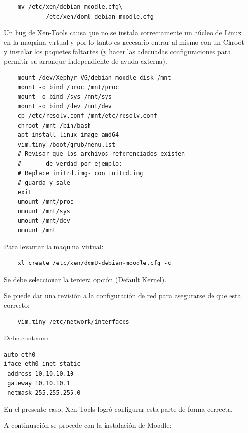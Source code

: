 \begin{lstlisting}
	mv /etc/xen/debian-moodle.cfg\
    		/etc/xen/domU-debian-moodle.cfg
\end{lstlisting}

Un bug de Xen-Tools causa que no se instala correctamente un núcleo de Linux en la maquina virtual y por lo tanto es necesario entrar al mismo con un Chroot y instalar los paquetes faltantes (y hacer las adecuadas configuraciones  para permitir su arranque independiente de ayuda externa).

\begin{lstlisting}
	mount /dev/Xephyr-VG/debian-moodle-disk /mnt
	mount -o bind /proc /mnt/proc
	mount -o bind /sys /mnt/sys
	mount -o bind /dev /mnt/dev
	cp /etc/resolv.conf /mnt/etc/resolv.conf
	chroot /mnt /bin/bash
	apt install linux-image-amd64
	vim.tiny /boot/grub/menu.lst
	# Revisar que los archivos referenciados existen
	#		de verdad por ejemplo:
	# Replace initrd.img- con initrd.img
    # guarda y sale
	exit
	umount /mnt/proc            
	umount /mnt/sys 
	umount /mnt/dev 
	umount /mnt	
\end{lstlisting}

Para levantar la maquina virtual:

\begin{lstlisting}
	xl create /etc/xen/domU-debian-moodle.cfg -c
\end{lstlisting}

Se debe seleccionar la tercera opción (Default Kernel).

Se puede dar una revisión a la configuración de red para asegurarse de que esta correcto:

\begin{lstlisting}
	vim.tiny /etc/network/interfaces
\end{lstlisting}

Debe contener:

\begin{lstlisting}
auto eth0
iface eth0 inet static
 address 10.10.10.10
 gateway 10.10.10.1
 netmask 255.255.255.0
\end{lstlisting}

En el presente caso, Xen-Tools logró configurar esta parte de forma correcta.

A continuación se procede con la instalación de Moodle:

